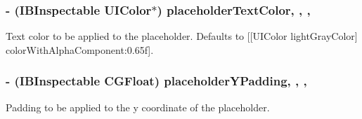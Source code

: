 \subsubsection[{placeholder\+Text\+Color}]{\setlength{\rightskip}{0pt plus 5cm}-\/ (I\+B\+Inspectable U\+I\+Color$\ast$) placeholder\+Text\+Color\hspace{0.3cm}{\ttfamily [read]}, {\ttfamily [write]}, {\ttfamily [nonatomic]}, {\ttfamily [strong]}}\label{interface_j_v_float_labeled_text_view_ada674f4ce304734239a459d1d2c822f1}
Text color to be applied to the placeholder. Defaults to {\ttfamily \mbox{[}\mbox{[}U\+I\+Color light\+Gray\+Color\mbox{]} color\+With\+Alpha\+Component\+:0.\+65f\mbox{]}}. \hypertarget{interface_j_v_float_labeled_text_view_afd73224d1c6564d0db5a36934fbd4909}{}
\subsubsection[{placeholder\+Y\+Padding}]{\setlength{\rightskip}{0pt plus 5cm}-\/ (I\+B\+Inspectable C\+G\+Float) placeholder\+Y\+Padding\hspace{0.3cm}{\ttfamily [read]}, {\ttfamily [write]}, {\ttfamily [nonatomic]}, {\ttfamily [assign]}}\label{interface_j_v_float_labeled_text_view_afd73224d1c6564d0db5a36934fbd4909}
Padding to be applied to the y coordinate of the placeholder. \hypertarget{interface_j_v_float_labeled_text_view_ac4b09dae01394be968952a684e92adb4}{}
